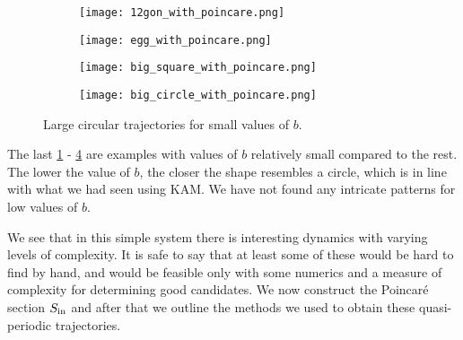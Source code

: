 \begin{figure}[!th]
\centering
\begin{subfigure}{0.49\textwidth}
\texttt{[image: 12gon\_with\_poincare.png]}
\caption{}
\label{subfig:bigcircle1}
\end{subfigure}
%
\begin{subfigure}{0.49\textwidth}
\texttt{[image: egg\_with\_poincare.png]}
\caption{}
\label{subfig:bigcircle2}
\end{subfigure}
%
\begin{subfigure}{0.49\textwidth}
\texttt{[image: big\_square\_with\_poincare.png]}
\caption{}
\label{subfig:bigcircle3}
\end{subfigure}
%
\begin{subfigure}{0.49\textwidth}
\texttt{[image: big\_circle\_with\_poincare.png]}
\caption{}
\label{subfig:bigcircle4}
\end{subfigure}
\caption{Large circular trajectories for small values of $b$.}
\label{fig:bigcircles}
\end{figure}

The last \ref{subfig:bigcircle1} - \ref{subfig:bigcircle4} are examples with values of $b$ relatively small compared to the rest. The lower the value of $b$, the closer the shape resembles a circle, which is in line with what we had seen using KAM. We have not found any intricate patterns for low values of $b$.

We see that in this simple system there is interesting dynamics with varying levels of complexity. It is safe to say that at least some of these would be hard to find by hand, and would be feasible only with some numerics and a measure of complexity for determining good candidates. We now construct the Poincar\'e section $S_\text{in}$ and after that we outline the methods we used to obtain these quasi-periodic trajectories.
